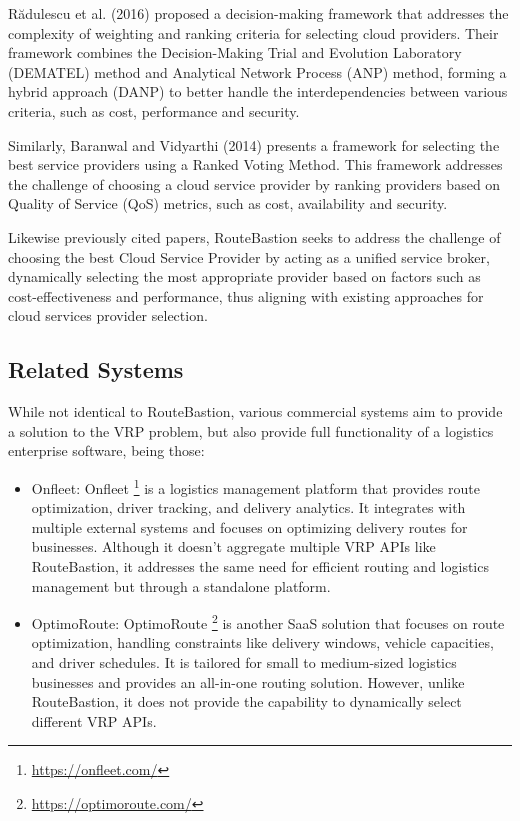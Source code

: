 Rădulescu et al. (2016) \cite{selection} proposed a decision-making framework that addresses the complexity of weighting and ranking criteria for selecting cloud providers. Their framework combines the Decision-Making Trial and Evolution Laboratory (DEMATEL) method and Analytical Network Process (ANP) method, forming a hybrid approach (DANP) to better handle the interdependencies between various criteria, such as cost, performance and security.

Similarly, Baranwal and Vidyarthi (2014) \cite{selection2} presents a framework for selecting the best service providers using a Ranked Voting Method. This framework addresses the challenge of choosing a cloud service provider by ranking providers based on Quality of Service (QoS) metrics, such as cost, availability and security.

Likewise previously cited papers, RouteBastion seeks to address the challenge of choosing the best Cloud Service Provider by acting as a unified service broker, dynamically selecting the most appropriate provider based on factors such as cost-effectiveness and performance, thus aligning with existing approaches for cloud services provider selection.

\subsection{Related Systems}

While not identical to RouteBastion, various commercial systems aim to provide a solution to the VRP problem, but also provide full functionality of a logistics enterprise software, being those:

\begin{itemize}
    \item {Onfleet: Onfleet \footnote{\url{https://onfleet.com/}} is a logistics management platform that provides route optimization, driver tracking, and delivery analytics. It integrates with multiple external systems and focuses on optimizing delivery routes for businesses. Although it doesn’t aggregate multiple VRP APIs like RouteBastion, it addresses the same need for efficient routing and logistics management but through a standalone platform.}

    \item {OptimoRoute: OptimoRoute \footnote{\url{https://optimoroute.com/}} is another SaaS solution that focuses on route optimization, handling constraints like delivery windows, vehicle capacities, and driver schedules. It is tailored for small to medium-sized logistics businesses and provides an all-in-one routing solution. However, unlike RouteBastion, it does not provide the capability to dynamically select different VRP APIs.}
\end{itemize}
